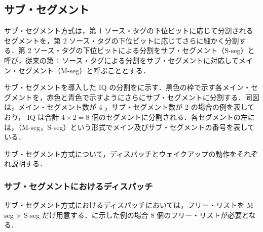 \subsection{サブ・セグメント}
\label{sec:sub_segment}
サブ・セグメント方式は，第 1 ソース・タグの下位ビットに応じて分割されるセグメントを，第 2 ソース・タグの下位ビットに応じてさらに細かく分割する．第 2 ソース・タグの下位ビットによる分割をサブ・セグメント（S-seg）と呼び，従来の第 1 ソース・タグによる分割をサブ・セグメントに対応してメイン・セグメント（M-seg）と呼ぶこととする．

サブ・セグメントを導入した IQ の分割をに示す．黒色の枠で示す各メイン・セグメントを，赤色と青色で示すようにさらにサブ・セグメントに分割する．同図は，メイン・セグメント数が 4 ，サブ・セグメント数が 2 の場合の例を表しており， IQ は合計 $4 \times 2 = 8$ 個のセグメントに分割される．各セグメントの左には，（M-seg，S-seg）という形式でメイン及びサブ・セグメントの番号を表している．

サブ・セグメント方式について，ディスパッチとウェイクアップの動作をそれぞれ説明する．

\subsubsection{サブ・セグメントにおけるディスパッチ}
サブ・セグメント方式におけるディスパッチにおいては，フリー・リストを M-seg $\times$ S-seg だけ用意する．に示した例の場合 8 個のフリー・リストが必要となる．

